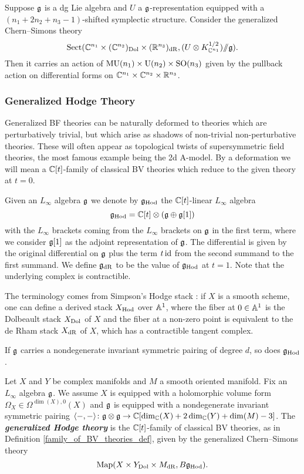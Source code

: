 \documentclass[10pt, oneside]{article}
\newcommand{\Hod}{\mathrm{Hod}}
\newcommand{\MU}{\mathrm{MU}}
\newcommand{\Sect}{\mathrm{Sect}}
\renewcommand{\U}{\mathrm{U}}
\newcommand{\ham}{/\!\!/}
\newcommand{\defterm}[1]{\textbf{\emph{#1}}}
\begin{document}
\begin{prop}
Suppose $\mathfrak g$ is a dg Lie algebra and $U$ a $\mathfrak g$-representation equipped with a $(n_1+2n_2+n_3-1)$-shifted symplectic structure. Consider the generalized Chern--Simons theory
\[\Sect(\CC^{n_1}\times (\CC^{n_2})_{\mr{Dol}}\times (\RR^{n_3})_{\mr{dR}}, (U\otimes K_{\CC^{n_1}}^{1/2})\ham\fg).\]
Then it carries an action of $\MU(n_1)\times \U(n_2)\times \SO(n_3)$ given by the pullback action on differential forms on $\mathbb C^{n_1}\times \mathbb C^{n_2}\times \mathbb R^{n_3}$.
\end{prop}

\subsubsection{Generalized Hodge Theory}
Generalized BF theories can be naturally deformed to theories which are perturbatively trivial, but which arise as shadows of non-trivial non-perturbative theories.  These will often appear as topological twists of supersymmetric field theories, the most famous example being the 2d A-model. By a deformation we will mean a $\mathbb C[t]$-family of classical BV theories which reduce to the given theory at $t=0$.

Given an $L_\infty$ algebra $\mathfrak g$ we denote by $\fg_{\Hod}$ the $\mathbb C[t]$-linear $L_\infty$ algebra
\[\fg_{\Hod} = \CC[t]\otimes (\fg\oplus \fg[1])\]
with the $L_\infty$ brackets coming from the $L_\infty$ brackets on $\mathfrak g$ in the first term, where we consider $\mathfrak g[1]$ as the adjoint representation of $\mathfrak g$. The differential is given by the original differential on $\mathfrak g$ plus the term $t\operatorname{id}$ from the second summand to the first summand. We define $\mathfrak g_{\mathrm{dR}}$ to be the value of $\fg_{\Hod}$ at $t=1$. Note that the underlying complex is contractible.

\begin{remark}
The terminology comes from Simpson's Hodge stack \cite{Simpson}: if $X$ is a smooth scheme, one can define a derived stack $X_{\mathrm{Hod}}$ over $\mathbb{A}^1$, where the fiber at $0 \in \mathbb{A}^1$ is the Dolbeault stack $X_{\mathrm{Dol}}$ of $X$ and the fiber at a non-zero point is equivalent to the de Rham stack $X_{\mathrm{dR}}$ of $X$, which has a contractible tangent complex.
\end{remark}

If $\mathfrak g$ carries a nondegenerate invariant symmetric pairing of degree $d$, so does $\fg_{\Hod}$.

\begin{definition} \label{Hodge_family_def}
Let $X$ and $Y$ be complex manifolds and $M$ a smooth oriented manifold. Fix an $L_\infty$ algebra $\mathfrak g$. We assume $X$ is equipped with a holomorphic volume form $\Omega_X \in\Omega^{\dim(X), 0}(X)$ and $\mathfrak g$ is equipped with a nondegenerate invariant symmetric pairing $\langle-, -\rangle\colon \mathfrak g\otimes\mathfrak g\rightarrow \mathbb C[\dim_\mathbb C(X) + 2\dim_\mathbb C(Y) + \dim(M) - 3]$. The \defterm{generalized Hodge theory} is the $\mathbb C[t]$-family of classical BV theories, as in Definition \ref{family_of_BV_theories_def}, given by the generalized Chern--Simons theory
\[\map(X\times Y_{\mr{Dol}}\times M_{\mr{dR}}, B \fg_\Hod).\]
\end{definition}
\end{document}
